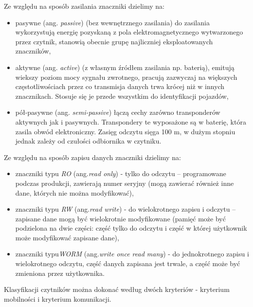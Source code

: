 \noindent 
Ze względu na sposób zasilania znaczniki dzielimy na: 
\begin{itemize}\setlength{\itemsep}{0pt}

	\item pasywne  (ang. \emph{passive}) (bez wewnętrznego zasilania) do zasilania  wykorzystują energię pozyskaną z pola elektromagnetycznego wytwarzonego przez czytnik, stanowią obecnie grupę najliczniej eksploatowanych znaczników, 

	\item aktywne (ang. \emph{active}) (z własnym źródłem zasilania np. baterią), emitują wiekszy poziom mocy sygnału zwrotnego, pracują zazwyczaj na większych częstotliwościach przez co transmisja danych trwa krócej niż w innych znacznikach. Stosuje się je przede wszystkim do identyfikacji pojazdów,
	
	\item pół-pasywne (ang. \emph{semi-passive}) łączą cechy zarówno transponderów aktywnych jak i pasywnych. Transpondery te wyposażone są w baterię, która zasila obwód elektroniczny. Zasięg odczytu sięga 100 m, w dużym stopniu jednak zależy od czułości odbiornika w czytniku.  

\end{itemize}

\noindent 
\newline Ze względu na sposób zapisu danych znaczniki dzielimy na:
\begin{itemize}\setlength{\itemsep}{0pt}

	\item znaczniki typu \emph{RO} (ang.\emph{read only}) - tylko do odczytu – programowane podczas produkcji, zawierają numer seryjny (mogą zawierać również inne dane, których nie można modyfikować), 

	\item znaczniki typu \emph{RW} (ang.\emph{read write}) - do wielokrotnego zapisu i odczytu – zapisane dane mogą być wielokrotnie modyfikowane (pamięć może być podzielona na dwie części: część tylko do odczytu i część w której użytkownik może modyfikować zapisane dane),

	\item znaczniki typu\emph{WORM} (ang.\emph{write once read many}) - do jednokrotnego zapisu i wielokrotnego odczytu, część danych zapisana jest trwale, a część może być zmieniona przez użytkownika.

\end{itemize}


\noindent 
\newline Klasyfikacji czytników można dokonać według dwóch kryteriów - kryterium mobilności i kryterium komunikacji.



